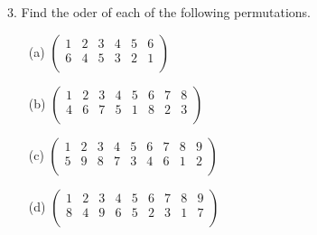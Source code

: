 \begin{mdframed}[style=darkAnswer,frametitle={Joe Starr}]
\end{mdframed}
\newpage
\begin{mdframed}[style=darkQuesion]
  3. Find the oder of each of the following permutations.
  \begin{itemize}
    \item [(a)] {
          $\begin{pmatrix}
              1 & 2 & 3 & 4 & 5 & 6 \\
              6 & 4 & 5 & 3 & 2 & 1 \\
            \end{pmatrix}$
          }
    \item [(b)] {
          $\begin{pmatrix}
              1 & 2 & 3 & 4 & 5 & 6 & 7 & 8 \\
              4 & 6 & 7 & 5 & 1 & 8 & 2 & 3 \\
            \end{pmatrix}$
          }
    \item [(c)] {
          $\begin{pmatrix}
              1 & 2 & 3 & 4 & 5 & 6 & 7 & 8 & 9 \\
              5 & 9 & 8 & 7 & 3 & 4 & 6 & 1 & 2 \\
            \end{pmatrix}$
          }
    \item [(d)] {
          $\begin{pmatrix}
              1 & 2 & 3 & 4 & 5 & 6 & 7 & 8 & 9 \\
              8 & 4 & 9 & 6 & 5 & 2 & 3 & 1 & 7 \\
            \end{pmatrix}$
          }
  \end{itemize}
\end{mdframed}

